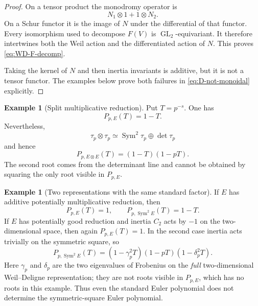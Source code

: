 \documentclass[11pt,reqno]{amsart}
\theoremstyle{definition}
\newtheorem{example}[theorem]{Example}
\theoremstyle{remark}
\newcommand{\GL}{\operatorname{GL}}
\newcommand{\Sym}{\operatorname{Sym}}
\begin{document}
\begin{proof}
On a tensor product the monodromy operator is
\begin{equation*}
 N_1\otimes1+1\otimes N_2.
\end{equation*}
On a Schur functor it is the image of $N$ under the differential of that
functor.  Every isomorphism used to decompose $F(V)$ is $\GL_2$-equivariant.
It therefore intertwines both the Weil action and the differentiated action
of $N$.  This proves \eqref{eq:WD-F-decomp}.

Taking the kernel of $N$ and then inertia invariants is additive, but it is not
a tensor functor.  The examples below prove both failures in
\eqref{eq:D-not-monoidal} explicitly.
\end{proof}

\begin{example}[Split multiplicative reduction]\label{ex:split-mult}
Put $T=p^{-s}$.  One has
\begin{equation*}
 P_{p,E}(T)=1-T.
\end{equation*}
Nevertheless,
\begin{equation*}
 \tau_p\otimes\tau_p\simeq\Sym^2\tau_p\oplus\det\tau_p
\end{equation*}
and hence
\begin{equation}\label{eq:split-tensor-counter}
 P_{p,E\otimes E}(T)=(1-T)(1-pT).
\end{equation}
The second root comes from the determinant line and cannot be obtained by
squaring the only root visible in $P_{p,E}$.
\end{example}

\begin{example}[Two representations with the same standard factor]
If $E$ has additive potentially multiplicative reduction, then
\begin{equation*}
 P_{p,E}(T)=1,
 \qquad
 P_{p,\Sym^2E}(T)=1-T.
\end{equation*}
If $E$ has potentially good reduction and inertia $C_2$ acts by $-1$ on the
two-dimensional space, then again $P_{p,E}(T)=1$.  In the second case inertia
acts trivially on the symmetric square, so
\begin{equation}\label{eq:C2-counter}
 P_{p,\Sym^2E}(T)=
 (1-\gamma_p^2T)(1-pT)(1-\delta_p^2T).
\end{equation}
Here $\gamma_p$ and $\delta_p$ are the two eigenvalues of Frobenius on the
\emph{full} two-dimensional Weil--Deligne representation; they are not roots
visible in $P_{p,E}$, which has no roots in this example.
Thus even the standard Euler polynomial does not determine the
symmetric-square Euler polynomial.
\end{example}
\end{document}

